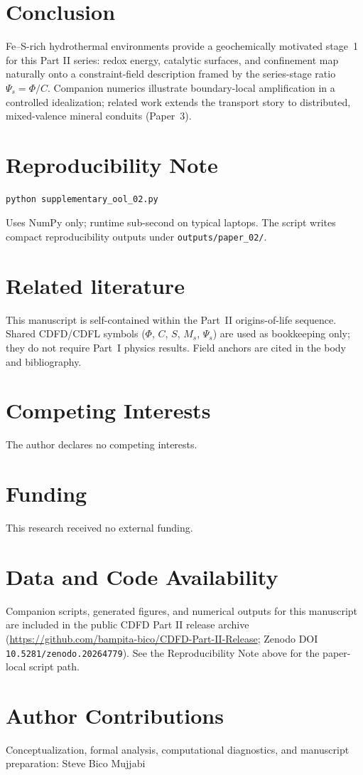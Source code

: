 \documentclass[11pt,a4paper]{article}
\begin{document}
\section{Conclusion}
Fe--S-rich hydrothermal environments provide a geochemically motivated stage~1 for this Part II series: redox energy, catalytic surfaces, and confinement map naturally onto a constraint-field description framed by the series-stage ratio $\Psi_s=\Phi/C$. Companion numerics illustrate boundary-local amplification in a controlled idealization; related work extends the transport story to distributed, mixed-valence mineral conduits (Paper~3).

\section{Reproducibility Note}
\begin{verbatim}
python supplementary_ool_02.py
\end{verbatim}
Uses NumPy only; runtime sub-second on typical laptops. The script writes compact reproducibility outputs under \texttt{outputs/paper\_02/}.

\section*{Related literature}
This manuscript is self-contained within the Part~II origins-of-life sequence. Shared CDFD/CDFL symbols ($\Phi$, $C$, $S$, $M_s$, $\Psi_s$) are used as bookkeeping only; they do not require Part~I physics results. Field anchors are cited in the body and bibliography.

\section*{Competing Interests}
The author declares no competing interests.

\section*{Funding}
This research received no external funding.

\section*{Data and Code Availability}
Companion scripts, generated figures, and numerical outputs for this manuscript are included in the public CDFD Part II release archive (\url{https://github.com/bampita-bico/CDFD-Part-II-Release}; Zenodo DOI \texttt{10.5281/zenodo.20264779}). See the Reproducibility Note above for the paper-local script path.

\section*{Author Contributions}
Conceptualization, formal analysis, computational diagnostics, and manuscript preparation: Steve Bico Mujjabi



\end{document}
